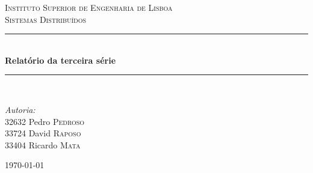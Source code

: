 \documentclass[a4paper]{article}
\newcommand{\HRule}{\rule{\linewidth}{0.5mm}} %
\begin{document}
\begin{titlepage}

\center %
 

\textsc{\LARGE Instituto Superior de Engenharia de Lisboa}\\[1.5cm] %
\textsc{\Large Sistemas Distribuídos}\\[0.5cm] %


\HRule \\[0.4cm]
{ \huge \bfseries Relatório da terceira série}\\[0.4cm] %
\HRule \\[1.5cm]
 

\begin{minipage}{0.4\textwidth}
\begin{flushleft} \large
\emph{Autoria:}\\
32632 Pedro \textsc{Pedroso} \\
33724 David \textsc{Raposo} \\
33404 Ricardo \textsc{Mata} \\
\end{flushleft}
\end{minipage}


{\large \today}\\[3cm] %

\vfill %

\end{titlepage}

\end{document}
